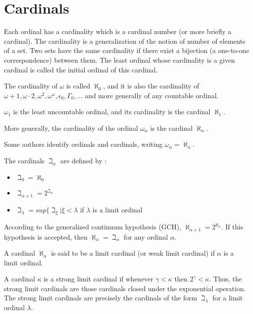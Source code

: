 \documentclass[10pt]{article}
\begin{document}
\section{Cardinals}

Each ordinal has a cardinality which is a cardinal number (or more briefly a cardinal). The cardinality is a generalization of the notion of number of elements of a set. Two sets have the same cardinality if there exist a bijection (a one-to-one correspondence) between them.
The least ordinal whose cardinality is a given cardinal is called the initial ordinal of this cardinal.

The cardinality of \( \omega \) is called \( \aleph_0 \), and it is also the cardinality of \( \omega+1, \omega \cdot 2, \omega^2, \omega^\omega, \epsilon_0, \Gamma_0, \ldots \) and more generally of any countable ordinal.

\( \omega_1 \) is the least uncountable ordinal, and its cardinality is the cardinal \( \aleph_1 \).

More generally, the cardinality of the ordinal \( \omega_\alpha \) is the cardinal \( \aleph_\alpha \).

Some authors identify ordinals and cardinals, writing \( \omega_\alpha = \aleph_\alpha \).

The cardinals \( \beth_\alpha \) are defined by :

\begin{itemize}
     \setlength{\itemsep}{1pt}
     \setlength{\parskip}{0pt}
     \setlength{\parsep}{0pt}

\item \( \beth_0 = \aleph_0 \)

\item \( \beth_{\alpha+1} = 2^{\beth_\alpha} \)

\item \( \beth_\lambda = sup \lbrace \beth_\xi | \xi < \lambda \) if \( \lambda \) is a limit ordinal

\end{itemize}

According to the generalized continuum hypothesis (GCH), \( \aleph_{\alpha+1} = 2^{\aleph_\alpha} \). If this hypothesis is accepted, then \( \aleph_\alpha = \beth_\alpha \) for any ordinal \( \alpha \).

A cardinal \( \aleph_\alpha \) is said to be a limit cardinal (or weak limit cardinal) if \( \alpha \) is a limit ordinal.

A cardinal \( \kappa \) is a strong limit cardinal if whenever \( \gamma < \kappa \) then \( 2^\gamma < \kappa \). Thus, the strong limit cardinals are those cardinals closed under the exponential operation. The strong limit cardinals are precisely the cardinals of the form \( \beth_\lambda \) for a limit ordinal \( \lambda \).
\end{document}
